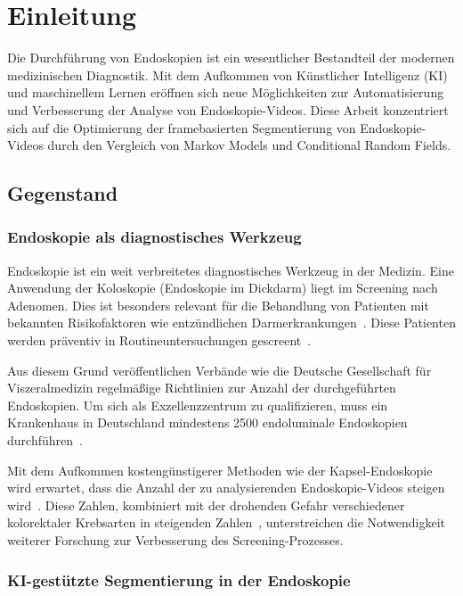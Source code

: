 \chapter{Einleitung}\label{ch:introduction}
Die Durchführung von Endoskopien ist ein wesentlicher Bestandteil der modernen medizinischen Diagnostik. Mit dem Aufkommen von Künstlicher Intelligenz (KI) und maschinellem Lernen eröffnen sich neue Möglichkeiten zur Automatisierung und Verbesserung der Analyse von Endoskopie-Videos. Diese Arbeit konzentriert sich auf die Optimierung der framebasierten Segmentierung von Endoskopie-Videos durch den Vergleich von Markov Models und Conditional Random Fields.

\section{Gegenstand}

\subsection{Endoskopie als diagnostisches Werkzeug}

Endoskopie ist ein weit verbreitetes diagnostisches Werkzeug in der Medizin. Eine Anwendung der Koloskopie (Endoskopie im Dickdarm) liegt im Screening nach Adenomen. Dies ist besonders relevant für die Behandlung von Patienten mit bekannten Risikofaktoren wie entzündlichen Darmerkrankungen~\citep{vleggaar-2007}. Diese Patienten werden präventiv in Routineuntersuchungen gescreent~\citep{arnold-2020}.

Aus diesem Grund veröffentlichen Verbände wie die Deutsche Gesellschaft für Viszeralmedizin regelmäßige Richtlinien zur Anzahl der durchgeführten Endoskopien. Um sich als Exzellenzzentrum zu qualifizieren, muss ein Krankenhaus in Deutschland mindestens 2500 endoluminale Endoskopien durchführen~\citep{dgav-ev-2015}.

Mit dem Aufkommen kostengünstigerer Methoden wie der Kapsel-Endoskopie wird erwartet, dass die Anzahl der zu analysierenden Endoskopie-Videos steigen wird~\citep{koulaouzidis-2021}\citep{8903282}. Diese Zahlen, kombiniert mit der drohenden Gefahr verschiedener kolorektaler Krebsarten in steigenden Zahlen~\citep{acs-2024,ferlay-2024}, unterstreichen die Notwendigkeit weiterer Forschung zur Verbesserung des Screening-Prozesses.

\subsection{KI-gestützte Segmentierung in der Endoskopie}

